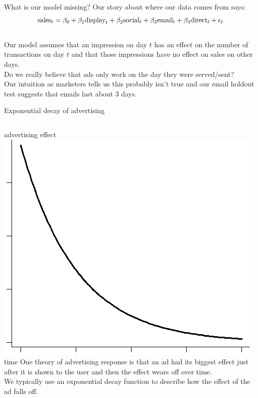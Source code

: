 \documentclass[10pt, aspectratio=169]{beamer}
\begin{document}
\begin{frame}{What is our model missing?}
Our story about where our data comes from says: 
\begin{equation*}
\textnormal{sales}_t = \beta_0 + \beta_1 \textnormal{display}_t + \beta_2 \textnormal{social}_t + \beta_3 \textnormal{email}_t + \beta_4 \textnormal{direct}_t + \epsilon_t
\end{equation*}\\
\bigskip \pause
Our model assumes that an impression on day $t$ has an effect on the number of transactions on day $t$ and that those impressions have no effect on sales on other days. \\
\bigskip \pause
Do we really believe that ads only work on the day they were served/sent?  \\
\bigskip \pause
Our intuition as marketers tells us this probably isn't true and our email holdout test suggests that emails last about 3 days.   
\end{frame}

\begin{frame}{Exponential decay of advertising}
\begin{columns}
advertising effect
\includegraphics[width=\textwidth]{images/exponential-decay.png}
\flushright time
One theory of advertising response is that an ad had its biggest effect just after it is shown to the user and then the effect wears off over time. \\
\bigskip \pause
We typically use an exponential decay function to describe how the effect of the ad falls off. 
\end{columns}
\end{frame}
\end{document}
